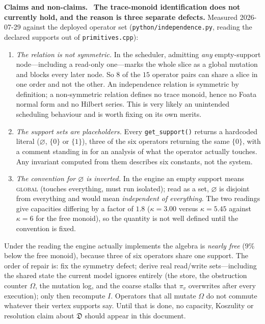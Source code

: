 \documentclass[11pt]{article}
\theoremstyle{definition}
\theoremstyle{plain}
\theoremstyle{remark}
\newcommand{\Hon}{\noindent\textbf{\color{honestycol}Claims and non-claims.}\ }
\newcommand{\Dop}{\mathfrak{D}}     %
\begin{document}
\begin{hon}\Hon
\textbf{The trace-monoid identification does not currently hold, and the reason is
three separate defects.} Measured 2026-07-29 against the deployed operator set
(\texttt{python/independence.py}, reading the declared supports out of
\texttt{primitives.cpp}):
\begin{enumerate}[label=(\roman*),nosep]
\item \emph{The relation is not symmetric.} In the scheduler, admitting \emph{any}
  empty-support node---including a read-only one---marks the whole slice as a global
  mutation and blocks every later node. So $8$ of the $15$ operator pairs can share a
  slice in one order and not the other. An independence relation is symmetric by
  definition; a non-symmetric relation defines no trace monoid, hence no Foata normal
  form and no Hilbert series. This is very likely an unintended scheduling behaviour
  and is worth fixing on its own merits.
\item \emph{The support sets are placeholders.} Every \texttt{get\_support()} returns a
  hardcoded literal ($\varnothing$, $\{0\}$ or $\{1\}$), three of the six operators
  returning the same $\{0\}$, with a comment standing in for an analysis of what the
  operator actually touches. Any invariant computed from them describes six constants,
  not the system.
\item \emph{The convention for $\varnothing$ is inverted.} In the engine an empty
  support means \textsc{global} (touches everything, must run isolated); read as a
  set, $\varnothing$ is disjoint from everything and would mean \emph{independent of
  everything}. The two readings give capacities differing by a factor of $1.8$
  ($\kappa=3.00$ versus $\kappa=5.45$ against $\kappa=6$ for the free monoid), so the
  quantity is not well defined until the convention is fixed.
\end{enumerate}
Under the reading the engine actually implements the algebra is \emph{nearly free}
($9\%$ below the free monoid), because three of six operators share one support. The
order of repair is: fix the symmetry defect; derive real read/write sets---including
the shared state the current model ignores entirely (the store, the obstruction counter
$\Omega$, the mutation log, and the coarse stalks that $\pi_v$ overwrites after every
execution); only then recompute $I$. Operators that all mutate $\Omega$ do not commute
whatever their vertex supports say. Until that is done, no capacity, Koszulity or
resolution claim about $\Dop$ should appear in this document.
\end{hon}
\end{document}
